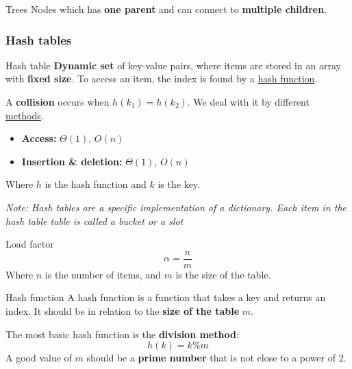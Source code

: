 \begin{definition}
    {Trees}
    Nodes which has \textbf{one parent} and can connect to \textbf{multiple children}.
\end{definition}

\subsubsection{Hash tables}

\begin{definition}
    {Hash table}
    \textbf{Dynamic set} of key-value pairs, where items are stored in an array with \textbf{fixed size}. To access an item, the index is found by a \hyperref[thm:hash-function]{hash function}.

    A \textbf{collision} occurs when $h(k_1) = h(k_2)$. We deal with it by different \hyperref[thm:collision-resolution]{methods}.

    \begin{itemize}
        \item \textbf{Access:} $\Theta(1)$, $O(n)$
        \item \textbf{Insertion \& deletion:} $\Theta(1)$, $O(n)$
    \end{itemize}

    Where $h$ is the hash function and $k$ is the key.

    \textit{Note: Hash tables are a specific implementation of a dictionary. Each item in the hash table table is called a bucket or a slot}
\end{definition}

\begin{knBox}
    {Load factor}
    \[
        \alpha = \frac{n}{m}
    \]
    Where $n$ is the number of items, and $m$ is the size of the table.
\end{knBox}

\begin{theorem}
    {Hash function}
    A hash function is a function that takes a key and returns an index. It should be in relation to the \textbf{size of the table} $m$.

    The most basic hash function is the \textbf{division method}:
    \[
        h(k) = k \% m
    \]
    A good value of $m$ should be a \textbf{prime number} that is not close to a power of 2.
\end{theorem}
\label{thm:hash-function}

